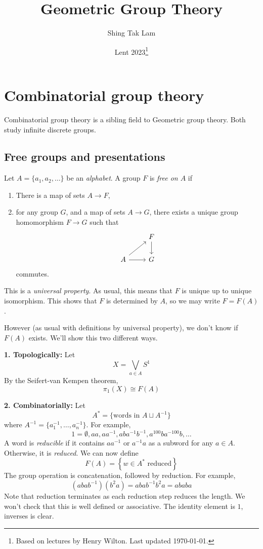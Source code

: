 \documentclass{article}
\title{Geometric Group Theory}
\author{Shing Tak Lam}
\date{Lent 2023\footnote{Based on lectures by Henry Wilton. Last updated \today.}}
\begin{document}
\maketitle

\tableofcontents

\lec

\section{Combinatorial group theory}

Combinatorial group theory is a sibling field to Geometric group theory. Both study infinite discrete groups.

\subsection{Free groups and presentations}

Let \(A = \{a_1, a_2, \dots\}\) be an \emph{alphabet}. A group \(F\) is \emph{free on \(A\)} if
\begin{enumerate}
    \item There is a map of sets \(A \to F\),
    \item for any group \(G\), and a map of sets \(A \to G\), there exists a unique group homomorphism \(F \to G\) such that
    \[\begin{tikzcd}
        & F \\
        A & G
        \arrow[from=2-1, to=1-2]
        \arrow[from=1-2, to=2-2]
        \arrow[from=2-1, to=2-2]
    \end{tikzcd}\]
    commutes.
\end{enumerate}
This is a \emph{universal property}. As usual, this means that \(F\) is unique up to unique isomorphism. This shows that \(F\) is determined by \(A\), so we may write \(F = F(A)\).

However (as usual with definitions by universal property), we don't know if \(F(A)\) exists. We'll show this two different ways.

\textbf{1. Topologically:} Let
\[X = \bigvee_{a \in A}S^1\]
By the Seifert-van Kempen theorem,
\[\pi_1(X) \cong F(A)\]

\textbf{2. Combinatorially:} Let
\[A^* = \{\text{words in }A \sqcup A^{-1}\}\]
where \(A^{-1} = \{a_1^{-1}, \dots, a_n^{-1}\}\). For example,
\[1 = \emptyset, aa, aa^{-1}, aba^{-1}b^{-1}, a^{100}ba^{-100}b, \dots\]
A word is \emph{reducible} if it contains \(aa^{-1}\) or \(a^{-1}a\) as a subword for any \(a \in A\). Otherwise, it is \emph{reduced}. We can now define
\[F(A) = \left\{w \in A^* \text{ reduced}\right\}\]
The group operation is concatenation, followed by reduction. For example,
\[(abab^{-1})(b^2a) = abab^{-1}b^2a = ababa\]
Note that reduction terminates as each reduction step reduces the length. We won't check that this is well defined or associative. The identity element is \(1\), inverses is clear.
\end{document}
